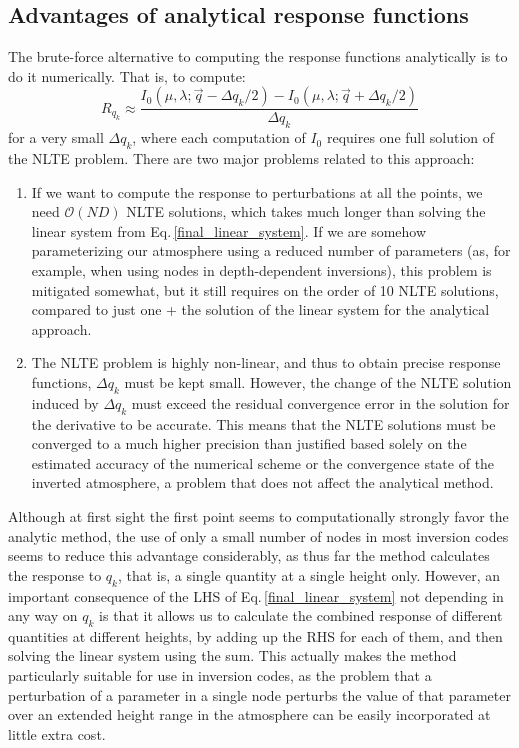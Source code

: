 \documentclass[referee]{aa}
\begin{document}
\subsection{Advantages of analytical response functions}

The brute-force alternative to computing the response functions analytically is to do it numerically. That is, to compute:
\begin{equation}
 R_{q_k} \approx \frac{I_0(\mu,\lambda; \vec{q} - \Delta q_k/2) - I_0(\mu,\lambda; \vec{q}+\Delta q_k/2)}{\Delta q_k}
 \label{fin_diff}
\end{equation}
for a very small $\Delta q_k$, where each computation of $I_0$ requires one full solution of the NLTE problem. There are two major problems related to this approach:
\begin{enumerate}
 \item If we want to compute the response to perturbations at all the points, we need $\mathcal{O}(ND)$ NLTE solutions, which takes much longer than solving the linear system from Eq.\,\ref{final_linear_system}. If we are somehow parameterizing our atmosphere using a reduced number of parameters (as, for example, when using nodes in depth-dependent inversions), this problem is mitigated somewhat, but it still requires on the order of 10 NLTE solutions, compared to just one + the solution of the linear system for the analytical approach.
 \item The NLTE problem is highly non-linear, and thus to obtain precise response functions, $\Delta q_k$ must be kept small. However, the change of the NLTE solution induced by $\Delta q_k$ must exceed the residual convergence error in the solution for the derivative to be accurate. This means that the NLTE solutions must be converged to a much higher precision than justified based solely on the estimated accuracy of the numerical scheme or the convergence state of the inverted atmosphere, a problem that does not affect the analytical method.
\end{enumerate}
Although at first sight the first point seems to computationally strongly favor the analytic method, the use of only a small number of nodes in most inversion codes seems to reduce this advantage considerably, as thus far the method calculates the response to $q_k$, that is, a single quantity at a single height only. However, an important consequence of the LHS of Eq.\,\ref{final_linear_system} not depending in any way on $q_k$ is that it allows us to calculate the combined response of different quantities at different heights, by adding up the RHS for each of them, and then solving the linear system using the sum. This actually makes the method particularly suitable for use in inversion codes, as the problem that a perturbation of a parameter in a single node perturbs the value of that parameter over an extended height range in the atmosphere can be easily incorporated at little extra cost.
\end{document}
